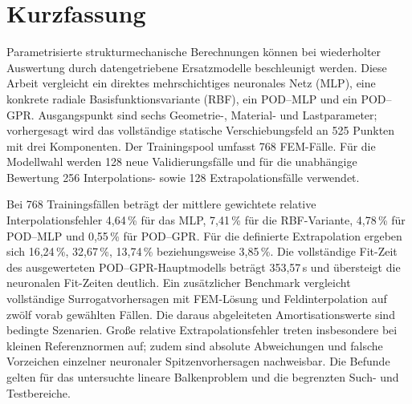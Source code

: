 \chapter*{Kurzfassung}
Parametrisierte strukturmechanische Berechnungen können bei wiederholter Auswertung durch datengetriebene Ersatzmodelle beschleunigt werden. Diese Arbeit vergleicht ein direktes mehrschichtiges neuronales Netz (MLP), eine konkrete radiale Basisfunktionsvariante (RBF), ein POD--MLP und ein POD--GPR. Ausgangspunkt sind sechs Geometrie-, Material- und Lastparameter; vorhergesagt wird das vollständige statische Verschiebungsfeld an 525 Punkten mit drei Komponenten. Der Trainingspool umfasst 768 FEM-Fälle. Für die Modellwahl werden 128 neue Validierungsfälle und für die unabhängige Bewertung 256 Interpolations- sowie 128 Extrapolationsfälle verwendet.

Bei 768 Trainingsfällen beträgt der mittlere gewichtete relative Interpolationsfehler 4,64\,\% für das MLP, 7,41\,\% für die RBF-Variante, 4,78\,\% für POD--MLP und 0,55\,\% für POD--GPR. Für die definierte Extrapolation ergeben sich 16,24\,\%, 32,67\,\%, 13,74\,\% beziehungsweise 3,85\,\%. Die vollständige Fit-Zeit des ausgewerteten POD--GPR-Hauptmodells beträgt 353,57\,s und übersteigt die neuronalen Fit-Zeiten deutlich. Ein zusätzlicher Benchmark vergleicht vollständige Surrogatvorhersagen mit FEM-Lösung und Feldinterpolation auf zwölf vorab gewählten Fällen. Die daraus abgeleiteten Amortisationswerte sind bedingte Szenarien. Große relative Extrapolationsfehler treten insbesondere bei kleinen Referenznormen auf; zudem sind absolute Abweichungen und falsche Vorzeichen einzelner neuronaler Spitzenvorhersagen nachweisbar. Die Befunde gelten für das untersuchte lineare Balkenproblem und die begrenzten Such- und Testbereiche.
